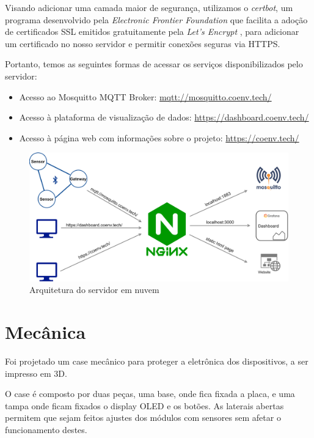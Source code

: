 \documentclass[../monografia.tex]{subfiles}
\begin{document}
Visando adicionar uma camada maior de segurança, utilizamos o \textit{certbot}, um programa desenvolvido pela \textit{Electronic Frontier Foundation} que facilita a adoção de certificados SSL emitidos gratuitamente pela \textit{Let's Encrypt} \cite{certbot}\cite{lets-encrypt}, para adicionar um certificado no nosso servidor e permitir conexões seguras via HTTPS. 

Portanto, temos as seguintes formas de acessar os serviços disponibilizados pelo servidor:

\begin{itemize}
	\item Acesso ao Mosquitto MQTT Broker: \underline{mqtt://mosquitto.coenv.tech/}
	\item Acesso à plataforma de visualização de dados: \underline{https://dashboard.coenv.tech/}
	\item Acesso à página web com informações sobre o projeto: \underline{https://coenv.tech/}
\end{itemize}


\begin{figure}[h!]
	\centering
	\includegraphics[scale=0.16]{server-architecture.png}
	\caption{Arquitetura do servidor em nuvem}
	\label{fig:cloud-server-architecture}
\end{figure}

\section{Mecânica}

Foi projetado um case mecânico para proteger a eletrônica dos dispositivos, a ser impresso em 3D. 

O case é composto por duas peças, uma base, onde fica fixada a placa, e uma tampa onde ficam fixados o display OLED e os botões. As laterais abertas permitem que sejam feitos ajustes dos módulos com sensores sem afetar o funcionamento destes. 
\end{document}
